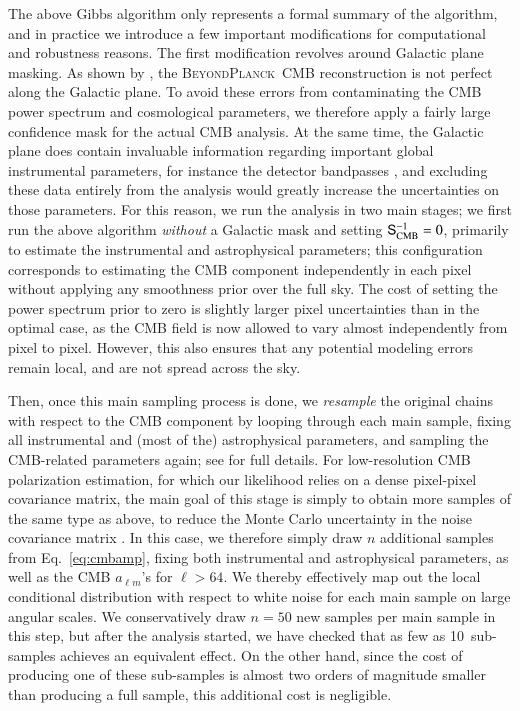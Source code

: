 \documentclass[twocolumn]{aa}
\renewcommand{\S}[0]{\tens{S}}
\newcommand{\BP}{\textsc{BeyondPlanck}}
\begin{document}
The above Gibbs algorithm only represents a formal summary of the
algorithm, and in practice we introduce a few important modifications
for computational and robustness reasons. The first modification
revolves around Galactic plane masking. As shown by \citet{bp11}, the
\BP\ CMB reconstruction is not perfect along the Galactic plane. To
avoid these errors from contaminating the CMB power spectrum and
cosmological parameters, we therefore apply a fairly large confidence
mask for the actual CMB analysis. At the same time, the Galactic plane
does contain invaluable information regarding important global
instrumental parameters, for instance the detector bandpasses
\citep{bp09}, and excluding these data entirely from the analysis
would greatly increase the uncertainties on those parameters. For this
reason, we run the analysis in two main stages; we first run the above
algorithm \emph{without} a Galactic mask and setting
$\S_{\mathrm{CMB}}^{-1} = 0$, primarily to estimate the
instrumental and astrophysical parameters; this configuration
corresponds to estimating the CMB component independently in each
pixel without applying any smoothness prior over the full sky. The
cost of setting the power spectrum prior to zero is slightly larger
pixel uncertainties than in the optimal case, as the CMB field is now
allowed to vary almost independently from pixel to pixel. However,
this also ensures that any potential modeling errors remain local,
and are not spread across the sky.

Then, once this main sampling process is done, we \emph{resample} the
original chains with respect to the CMB component by looping through
each main sample, fixing all instrumental and (most of the)
astrophysical parameters, and sampling the CMB-related parameters
again; see \citet{bp11} for full details. For low-resolution CMB
polarization estimation, for which our likelihood relies on a dense
pixel-pixel covariance matrix, the main goal of this stage is simply
to obtain more samples of the same type as above, to reduce the Monte
Carlo uncertainty in the noise covariance matrix
\citep{sellentin2016}. In this case, we therefore simply draw $n$
additional samples from Eq.~\eqref{eq:cmbamp}, fixing both
instrumental and astrophysical parameters, as well as the CMB $a_{\ell
  m}$'s for $\ell>64$. We thereby effectively map out the local
conditional distribution with respect to white noise for each main sample
on large angular scales. We conservatively draw $n=50$ new samples per
main sample in this step, but after the analysis started, we have
checked that as few as 10~sub-samples achieves an equivalent
effect. On the other hand, since the cost of producing one of these
sub-samples is almost two orders of magnitude smaller than producing a
full sample, this additional cost is negligible.
\end{document}
